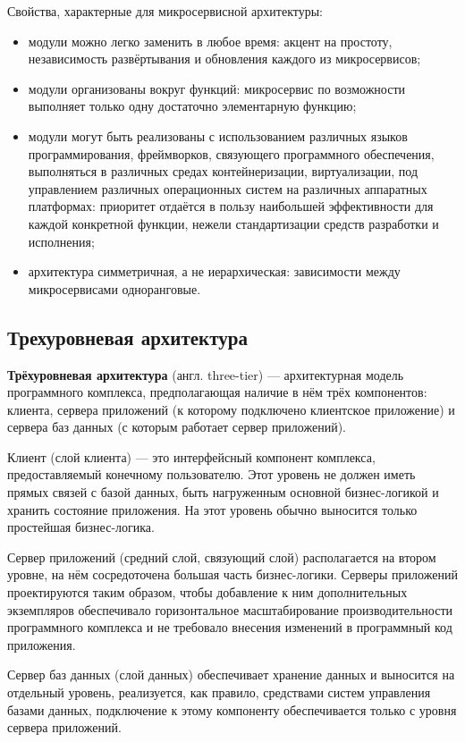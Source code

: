 \documentclass[times]{itmo-student-thesis}
\begin{document}
Свойства, характерные для микросервисной архитектуры:
\begin{itemize}
\item модули можно легко заменить в любое время: акцент на простоту, независимость развёртывания и обновления каждого из микросервисов;
\item модули организованы вокруг функций: микросервис по возможности выполняет только одну достаточно элементарную функцию;
\item модули могут быть реализованы с использованием различных языков программирования, фреймворков, связующего программного обеспечения, выполняться в различных средах контейнеризации, виртуализации, под управлением различных операционных систем на различных аппаратных платформах: приоритет отдаётся в пользу наибольшей эффективности для каждой конкретной функции, нежели стандартизации средств разработки и исполнения;
\item архитектура симметричная, а не иерархическая: зависимости между микросервисами одноранговые.
\end{itemize}


\subsection{Трехуровневая архитектура}

\textbf{Трёхуровневая архитектура} (англ. three-tier) — архитектурная модель программного комплекса, предполагающая наличие в нём трёх компонентов: клиента, сервера приложений (к которому подключено клиентское приложение) и сервера баз данных (с которым работает сервер приложений).

Клиент (слой клиента) — это интерфейсный компонент комплекса, предоставляемый конечному пользователю. Этот уровень не должен иметь прямых связей с базой данных, быть нагруженным основной бизнес-логикой и хранить состояние приложения. На этот уровень обычно выносится только простейшая бизнес-логика.

Сервер приложений (средний слой, связующий слой) располагается на втором уровне, на нём сосредоточена большая часть бизнес-логики. Серверы приложений проектируются таким образом, чтобы добавление к ним дополнительных экземпляров обеспечивало горизонтальное масштабирование производительности программного комплекса и не требовало внесения изменений в программный код приложения.

Сервер баз данных (слой данных) обеспечивает хранение данных и выносится на отдельный уровень, реализуется, как правило, средствами систем управления базами данных, подключение к этому компоненту обеспечивается только с уровня сервера приложений.
\end{document}
